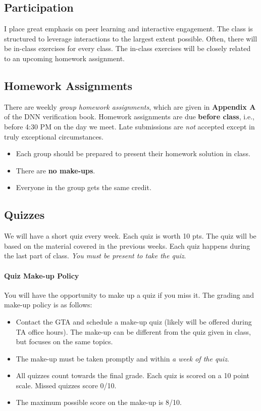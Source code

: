 \documentclass[11pt]{article}
\begin{document}
\subsection{Participation}

I place great emphasis on peer learning and interactive engagement. The class is structured to leverage interactions to the largest extent possible. Often, there will be in-class exercises for every class. The in-class exercises will be closely related to an upcoming homework assignment.


\subsection{Homework Assignments}\label{homework-assignments}

There are weekly \emph{group homework assignments}, which are given in \textbf{Appendix A} of the DNN verification book. Homework assignments are due \textbf{before class}, i.e., before 4:30 PM on the day we meet. Late submissions are \emph{not} accepted except in truly exceptional circumstances.

\begin{itemize}
\item
Each group should be prepared to present their homework solution in
class.

\item There are \textbf{no make-ups}.
\item Everyone in the group gets the same credit.
\end{itemize}



\subsection{Quizzes}\label{weekly-quizzes}

We will have a short quiz every week. Each quiz is worth 10 pts. The quiz will be based on the material covered in the previous weeks. Each quiz happens during the last part of class. \emph{You must be present to take the quiz}.


\paragraph{Quiz Make-up Policy} You will have the opportunity to make up a quiz if you miss it. The grading and make-up policy is as follows:

\begin{itemize}
\item Contact the GTA and schedule a make-up quiz (likely will be offered during TA office hours). The make-up can be different from the quiz given in class, but focuses on the same topics.
\item
  The make-up must be taken promptly and within \emph{a week of the quiz}.
\item
  All quizzes count towards the final grade. Each quiz is scored on a 10
  point scale. Missed quizzes score 0/10.
\item
  The maximum possible score on the make-up is 8/10. 

\end{itemize}
\end{document}
